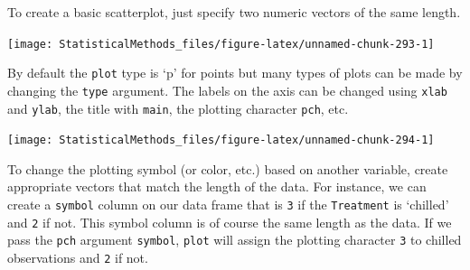 \documentclass[
]{book}
\newenvironment{Shaded}{\begin{snugshade}}{\end{snugshade}}
\newcommand{\DataTypeTok}[1]{\textcolor[rgb]{0.13,0.29,0.53}{#1}}
\newcommand{\DecValTok}[1]{\textcolor[rgb]{0.00,0.00,0.81}{#1}}
\newcommand{\KeywordTok}[1]{\textcolor[rgb]{0.13,0.29,0.53}{\textbf{#1}}}
\newcommand{\NormalTok}[1]{#1}
\newcommand{\OperatorTok}[1]{\textcolor[rgb]{0.81,0.36,0.00}{\textbf{#1}}}
\newcommand{\StringTok}[1]{\textcolor[rgb]{0.31,0.60,0.02}{#1}}
\theoremstyle{definition}
\theoremstyle{definition}
\theoremstyle{definition}
\theoremstyle{remark}
\begin{document}
To create a basic scatterplot, just specify two numeric vectors of the same length.

\begin{Shaded}
\end{Shaded}

\begin{center}\texttt{[image: StatisticalMethods\_files/figure-latex/unnamed-chunk-293-1]} \end{center}

By default the \texttt{plot} type is `p' for points but many types of plots can be made by changing the \texttt{type} argument. The labels on the axis can be changed using \texttt{xlab} and \texttt{ylab}, the title with \texttt{main}, the plotting character \texttt{pch}, etc.

\begin{Shaded}
\end{Shaded}

\begin{center}\texttt{[image: StatisticalMethods\_files/figure-latex/unnamed-chunk-294-1]} \end{center}

To change the plotting symbol (or color, etc.) based on another variable, create appropriate vectors that match the length of the data. For instance, we can create a \texttt{symbol} column on our data frame that is \texttt{3} if the \texttt{Treatment} is `chilled' and \texttt{2} if not. This symbol column is of course the same length as the data. If we pass the \texttt{pch} argument \texttt{symbol}, \texttt{plot} will assign the plotting character \texttt{3} to chilled observations and \texttt{2} if not.
\end{document}
